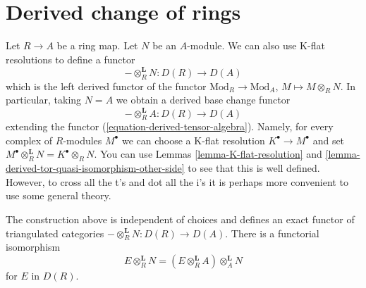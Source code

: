 \section{Derived change of rings}
\label{section-derived-base-change}

\noindent
Let $R \to A$ be a ring map. Let $N$ be an $A$-module. We can also use K-flat
resolutions to define a functor
$$
- \otimes_R^{\mathbf{L}} N : D(R) \to D(A)
$$
which is the left derived functor of the functor
$\text{Mod}_R \to \text{Mod}_A$, $M \mapsto M \otimes_R N$.
In particular, taking $N = A$ we obtain a derived base change functor
$$
- \otimes_R^{\mathbf{L}} A : D(R) \to D(A)
$$
extending the functor (\ref{equation-derived-tensor-algebra}).
Namely, for every complex of $R$-modules $M^\bullet$ we can
choose a K-flat resolution $K^\bullet \to M^\bullet$ and set
$M^\bullet \otimes_R^{\mathbf{L}} N = K^\bullet \otimes_R N$.
You can use
Lemmas \ref{lemma-K-flat-resolution} and
\ref{lemma-derived-tor-quasi-isomorphism-other-side}
to see that this is well defined. However, to cross all the t's and dot all
the i's it is perhaps more convenient to use some general theory.

\begin{lemma}
\label{lemma-derived-base-change}
The construction above is independent of choices and defines an exact
functor of triangulated categories $- \otimes_R^\mathbf{L} N : D(R) \to D(A)$.
There is a functorial isomorphism
$$
E \otimes_R^\mathbf{L} N = (E \otimes_R^\mathbf{L} A) \otimes_A^\mathbf{L} N
$$
for $E$ in $D(R)$.
\end{lemma}

